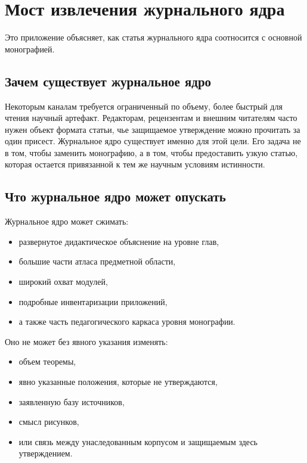 \section{Мост извлечения журнального ядра}

Это приложение объясняет, как статья журнального ядра соотносится с основной монографией.

\subsection{Зачем существует журнальное ядро}

Некоторым каналам требуется ограниченный по объему, более быстрый для чтения научный артефакт.
Редакторам, рецензентам и внешним читателям часто нужен объект формата статьи, чье защищаемое утверждение можно
прочитать за один присест.
Журнальное ядро существует именно для этой цели.
Его задача не в том, чтобы заменить монографию, а в том, чтобы предоставить узкую статью, которая остается привязанной к
тем же научным условиям истинности.

\subsection{Что журнальное ядро может опускать}

Журнальное ядро может сжимать:

\begin{itemize}
\item развернутое дидактическое объяснение на уровне глав,
\item большие части атласа предметной области,
\item широкий охват модулей,
\item подробные инвентаризации приложений,
\item а также часть педагогического каркаса уровня монографии.
\end{itemize}

Оно не может без явного указания изменять:

\begin{itemize}
\item объем теоремы,
\item явно указанные положения, которые не утверждаются,
\item заявленную базу источников,
\item смысл рисунков,
\item или связь между унаследованным корпусом и защищаемым здесь утверждением.
\end{itemize}

